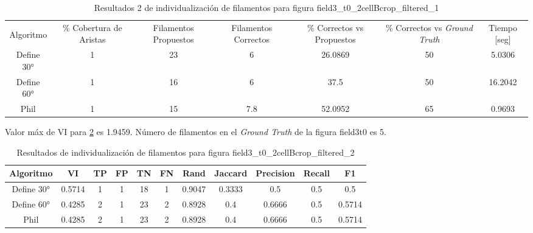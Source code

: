 \begin{table}[h]
    \centering
    \begin{tabular}{|c|c|c|c|c|c|c|}
    \hline
         & \multirow{4}{2cm}{\centering \% Cobertura de Aristas} & \multirow{4}{2cm}{Filamentos Propuestos} & \multirow{4}{2cm}{Filamentos Correctos} & \multirow{4}{2.5cm}{\% Correctos vs Propuestos} & \multirow{4}{2.5cm}{\centering \% Correctos vs {\it Ground Truth}} & \multirow{4}{1.2cm}{\centering Tiempo [seg]} \\
         &  &  &  & & &  \\
        Algoritmo &  &  &  & & &  \\
        &  &  &  & & &  \\ \hline
        Define 30° &  1 & 23 & 6 & 26.0869 & 50 & 5.0306 \\
        Define 60° &  1 & 16 & 6 & 37.5 & 50 & 16.2042\\ 
        Phil &  1 & 15 & 7.8 & 52.0952 & 65 & 0.9693 \\
        \hline
    \end{tabular}
    \caption{Resultados 2 de individualizaci\'on de filamentos para figura field3_t0_2cellBcrop_filtered_1}
    \label{tab:field3t0filtered1-2}
\end{table}


Valor m\'ax de VI para \ref{tab:field3t0filtered2} es 1.9459.
N\'umero de filamentos en el {\it Ground Truth} de la figura field3t0 es 5.

\begin{table}[h]
    \centering
    \begin{tabular}{|c|c|c|c|c|c|c|c|c|c|c|}
    \hline
        Algoritmo & VI & TP & FP &TN &FN & Rand	& Jaccard &	Precision &	Recall &	F1 \\ \hline
        Define 30° & 0.5714 & 1 & 1 & 18 & 1 & 0.9047 & 0.3333 & 0.5      & 0.5 & 0.5\\
        Define 60° & 0.4285 & 2 & 1 & 23 & 2 & 0.8928 & 0.4 & 0.6666 & 0.5 & 0.5714\\ 
        Phil & 0.4285  & 2 & 1 & 23 & 2 & 0.8928 & 0.4 & 0.6666 & 0.5 & 0.5714\\
        \hline
    \end{tabular}
    \caption{Resultados de individualizaci\'on de filamentos para figura field3_t0_2cellBcrop_filtered_2}
    \label{tab:field3t0filtered2}
\end{table}

